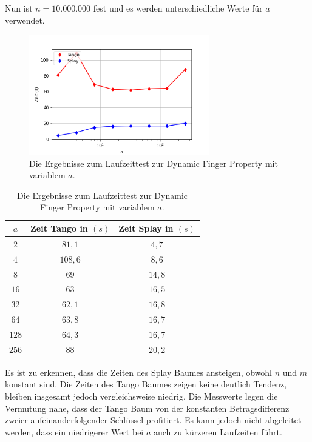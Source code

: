 \documentclass[a4paper,12pt]{article}
\begin{document}
\noindent Nun ist $n = 10.000.000$ fest und es werden unterschiedliche Werte für $a$ verwendet.

\begin{figure}[H]
	\centering
	\includegraphics[width=0.7\textwidth]{Medien/laufzeittest/diagramm/dynamicfingerNfest}
	\caption{Die Ergebnisse zum Laufzeittest zur Dynamic Finger Property mit variablem $a$.}
\end{figure}
\begin{table}[H]
	\begin{center}
		\begin{tabular}[c]{|c|c|c|}
			\hline
			$a$ & Zeit Tango in $\left(s\right)$ &Zeit Splay in $\left(s\right)$ \\
			\hline
			$2$ & $81,1$ &$4,7$ \\
			\hline
			$4$  & $108,6$ &$8,6$  \\
			\hline
			$8$  & $69$ &$14,8$  \\
			\hline
			$16$  & $63$ &$16,5$  \\
			\hline
			$32$  & $62,1$ &$16,8$  \\
			\hline
			$64$  & $63,8$ &$16,7$  \\
			\hline
			$128$  & $64,3$ &$16,7$  \\
			\hline
			$256$  & $88$ &$20,2$  \\
			\hline
		\end{tabular}
		\caption {Die Ergebnisse zum Laufzeittest zur Dynamic Finger Property mit variablem $a$.} 
	\end{center}
\end{table}\noindent Es ist zu erkennen, dass die Zeiten des Splay Baumes ansteigen, obwohl $n$ und $m$ konstant sind. Die Zeiten des Tango Baumes zeigen keine deutlich Tendenz, bleiben insgesamt jedoch vergleichsweise niedrig. Die Messwerte legen die Vermutung nahe, dass der Tango Baum von der konstanten Betragsdifferenz zweier aufeinanderfolgender Schlüssel profitiert. Es kann jedoch nicht abgeleitet werden, dass ein niedrigerer Wert bei $a$ auch zu kürzeren Laufzeiten führt.  
\end{document}
